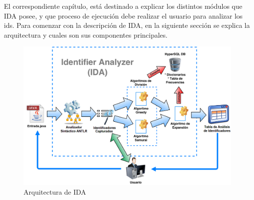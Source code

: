 El correspondiente capítulo, está destinado a explicar los distintos módulos que IDA posee, y que proceso de ejecución debe realizar el usuario para analizar los ids.
Para comenzar con la descripción de IDA, en la siguiente sección se explica la arquitectura y cuales son sus componentes principales.


%



\begin{figure}[t] %
\centerline{%
\includegraphics[scale= 0.35]{./cap4/ida_arq.png}
}
\caption{Arquitectura de IDA}
\label{arq1}
\end{figure}


